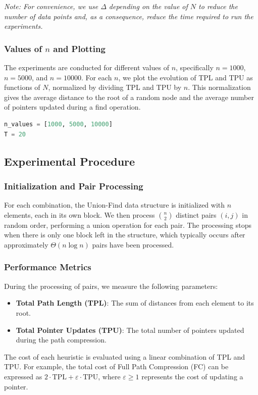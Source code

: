 \documentclass[10pt,a4paper,hidelinks]{article}
\begin{document}
\textit{Note: For convenience, we use $\Delta$ depending on the value of $N$ to reduce the number of data points and, as a consequence, reduce the time required to run the experiments.}

\subsubsection{Values of $n$ and Plotting}
The experiments are conducted for different values of $n$, specifically $n = 1000$, $n = 5000$, and $n = 10000$. For each $n$, we plot the evolution of TPL and TPU as functions of $N$, normalized by dividing TPL and TPU by $n$. This normalization gives the average distance to the root of a random node and the average number of pointers updated during a find operation.
\begin{lstlisting}[language=Python]
n_values = [1000, 5000, 10000]
T = 20
\end{lstlisting}

\subsection{Experimental Procedure}
\subsubsection{Initialization and Pair Processing}
For each combination, the Union-Find data structure is initialized with $n$ elements, each in its own block. We then process $\binom{n}{2}$ distinct pairs $(i, j)$ in random order, performing a union operation for each pair. The processing stops when there is only one block left in the structure, which typically occurs after approximately $\Theta(n \log n)$ pairs have been processed.

\subsubsection{Performance Metrics}
During the processing of pairs, we measure the following parameters:
\begin{itemize}
    \item \textbf{Total Path Length (TPL)}: The sum of distances from each element to its root.
    \item \textbf{Total Pointer Updates (TPU)}: The total number of pointers updated during the path compression.
\end{itemize}

The cost of each heuristic is evaluated using a linear combination of TPL and TPU. For example, the total cost of Full Path Compression (FC) can be expressed as $2 \cdot \text{TPL} + \varepsilon \cdot \text{TPU}$, where $\varepsilon \geq 1$ represents the cost of updating a pointer.
\end{document}
